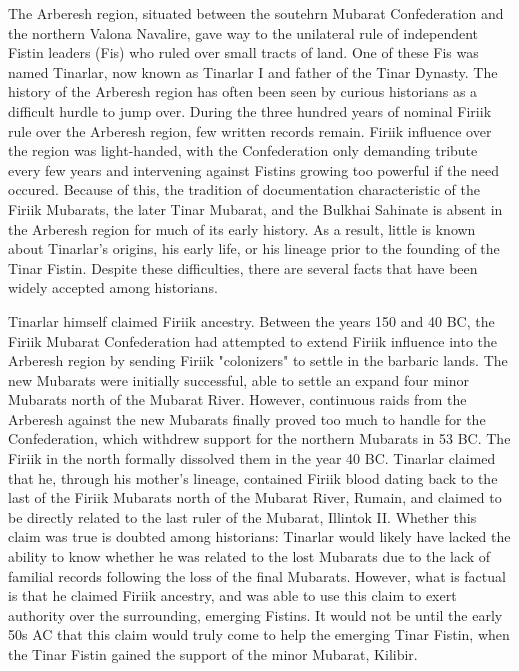 \begin{multicols}{2}
						The Arberesh region, situated between the soutehrn Mubarat Confederation and the northern Valona Navalire, gave way to the unilateral rule of independent Fistin leaders (Fis) who ruled over small tracts of land. One of these Fis was named Tinarlar, now known as Tinarlar I and father of the Tinar Dynasty. The history of the Arberesh region has often been seen by curious historians as a difficult hurdle to jump over. During the three hundred years of nominal Firiik rule over the Arberesh region, few written records remain. Firiik influence over the region was light-handed, with the Confederation only demanding tribute every few years and intervening against Fistins growing too powerful if the need occured. Because of this, the tradition of documentation characteristic of the Firiik Mubarats, the later Tinar Mubarat, and the Bulkhai Sahinate is absent in the Arberesh region for much of its early history. As a result, little is known about Tinarlar's origins, his early life, or his lineage prior to the founding of the Tinar Fistin. Despite these difficulties, there are several facts that have been widely accepted among historians.
					
						Tinarlar himself claimed Firiik ancestry. Between the years 150 and 40 BC, the Firiik Mubarat Confederation had attempted to extend Firiik influence into the Arberesh region by sending Firiik "colonizers" to settle in the barbaric lands. The new Mubarats were initially successful, able to settle an expand four minor Mubarats north of the Mubarat River. However, continuous raids from the Arberesh against the new Mubarats finally proved too much to handle for the Confederation, which withdrew support for the northern Mubarats in 53 BC. The Firiik in the north formally dissolved them in the year 40 BC. Tinarlar claimed that he, through his mother's lineage, contained Firiik blood dating back to the last of the Firiik Mubarats north of the Mubarat River, Rumain, and claimed to be directly related to the last ruler of the Mubarat, Illintok II. Whether this claim was true is doubted among historians: Tinarlar would likely have lacked the ability to know whether he was related to the lost Mubarats due to the lack of familial records following the loss of the final Mubarats. However, what is factual is that he claimed Firiik ancestry, and was able to use this claim to exert authority over the surrounding, emerging Fistins. It would not be until the early 50s AC that this claim would truly come to help the emerging Tinar Fistin, when the Tinar Fistin gained the support of the minor Mubarat, Kilibir.
					

\end{multicols}
